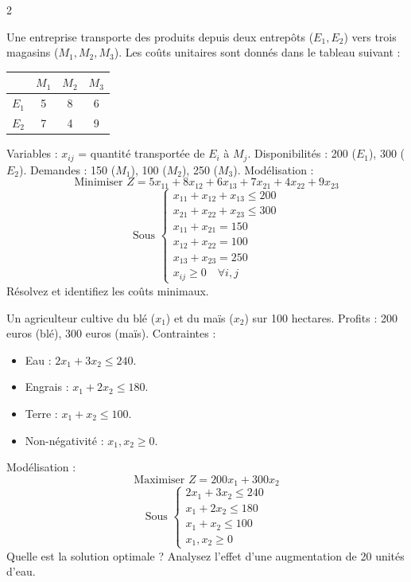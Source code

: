 \begin{multicols}{2}
\begin{exo}
	Une entreprise transporte des produits depuis deux entrepôts (\(E_1, E_2\)) vers trois magasins (\(M_1, M_2, M_3\)). Les coûts unitaires sont donnés dans le tableau suivant :
	\begin{center}
		\begin{tabular}{c|ccc}
			& \(M_1\) & \(M_2\) & \(M_3\) \\
			\hline
			\(E_1\) & 5 & 8 & 6 \\
			\(E_2\) & 7 & 4 & 9 \\
		\end{tabular}
	\end{center}
	Variables : \(x_{ij}\) = quantité transportée de \(E_i\) à \(M_j\). Disponibilités : 200 (\(E_1\)), 300 (\(E_2\)). Demandes : 150 (\(M_1\)), 100 (\(M_2\)), 250 (\(M_3\)).
	Modélisation :
	\[
	\text{Minimiser } Z = 5x_{11} + 8x_{12} + 6x_{13} + 7x_{21} + 4x_{22} + 9x_{23}
	\]
	\[
	\text{Sous } \begin{cases}
	x_{11} + x_{12} + x_{13} \leq 200 \\
	x_{21} + x_{22} + x_{23} \leq 300 \\
	x_{11} + x_{21} = 150 \\
	x_{12} + x_{22} = 100 \\
	x_{13} + x_{23} = 250 \\
	x_{ij} \geq 0 \quad \forall i,j
	\end{cases}
	\]
	Résolvez et identifiez les coûts minimaux.
\end{exo}

\begin{exo}
	Un agriculteur cultive du blé (\(x_1\)) et du maïs (\(x_2\)) sur 100 hectares. Profits : 200 euros (blé), 300 euros (maïs). Contraintes :
	\begin{itemize}
		\item Eau : \(2x_1 + 3x_2 \leq 240\).
		\item Engrais : \(x_1 + 2x_2 \leq 180\).
		\item Terre : \(x_1 + x_2 \leq 100\).
		\item Non-négativité : \(x_1, x_2 \geq 0\).
	\end{itemize}
	Modélisation :
	\[
	\text{Maximiser } Z = 200x_1 + 300x_2
	\]
	\[
	\text{Sous } \begin{cases}
	2x_1 + 3x_2 \leq 240 \\
	x_1 + 2x_2 \leq 180 \\
	x_1 + x_2 \leq 100 \\
	x_1, x_2 \geq 0
	\end{cases}
	\]
	Quelle est la solution optimale ? Analysez l'effet d'une augmentation de 20 unités d'eau.
\end{exo}


\end{multicols}
